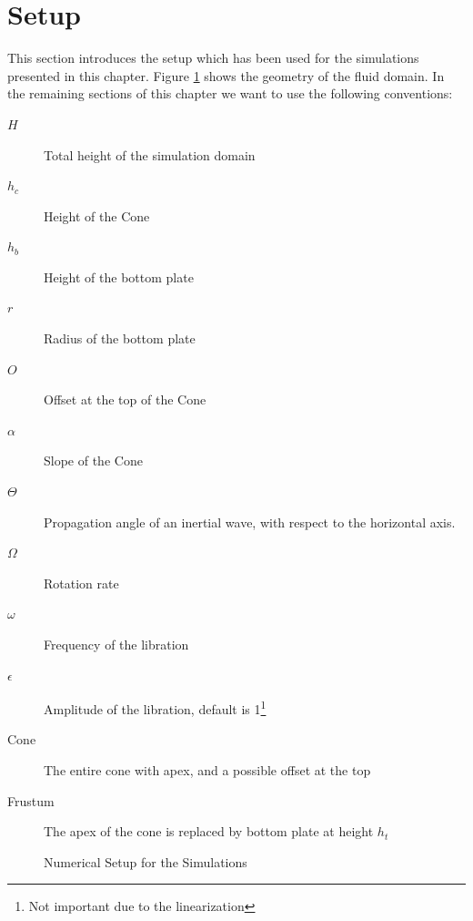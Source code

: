 \newpage

\section{Setup}

This section introduces the setup which has been used for the simulations presented in this chapter.
Figure \ref{cone:setup_image} shows the geometry of the fluid domain.
In the remaining sections of this chapter we want to use the following conventions:

\begin{multicols}{2}
\begin{description}
    \item[$H$]{Total height of the simulation domain}
    \item[$h_c$]{Height of the Cone}
    \item[$h_b$]{Height of the bottom plate}
    \item[$r$]{Radius of the bottom plate}
    \item[$O$]{Offset at the top of the Cone}
    \item[$\alpha$]{Slope of the Cone}
    \item[$\Theta$]{Propagation angle of an inertial wave, with respect to the horizontal axis.}
    \item[$\Omega$]{Rotation rate}
    \item[$\omega$]{Frequency of the libration}
    \item[$\epsilon$]{Amplitude of the libration, default is 1\footnote{Not important due to the linearization}}
    \item[Cone] {The entire cone with apex, and a possible offset at the top}
    \item[Frustum]{The apex of the cone is replaced by bottom plate at height $h_t$}
\end{description}
\end{multicols}


\begin{figure}[!bp]
  \centering
      \caption{Numerical Setup for the Simulations \label{cone:setup_image} }
\end{figure}
\clearpage

